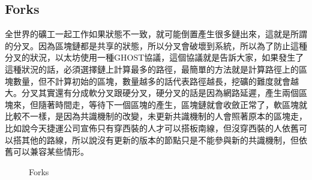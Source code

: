 \documentclass[12pt, a4paper]{article}
\begin{document}
\subsection{Forks}
全世界的礦工一起工作如果狀態不一致，就可能倒置產生很多鏈出來，這就是所謂的分叉。因為區塊鏈都是共享的狀態，所以分叉會破壞到系統，所以為了防止這種分叉的狀況，以太坊使用一種GHOST協議，這個協議就是告訴大家，如果發生了這種狀況的話，必須選擇鏈上計算最多的路徑，最簡單的方法就是計算路徑上的區塊數量，但不計算初始的區塊，數量越多的話代表路徑越長，挖礦的難度就會越大。分叉其實還有分成軟分叉跟硬分叉，硬分叉的話是因為網路延遲，產生兩個區塊來，但隨著時間走，等待下一個區塊的產生，區塊鏈就會收斂正常了，軟區塊就比較不一樣，是因為共識機制的改變，未更新共識機制的人會照著原本的區塊走，比如說今天捷運公司宣佈只有穿西裝的人才可以搭板南線，但沒穿西裝的人依舊可以搭其他的路線，所以說沒有更新的版本的節點只是不能參與新的共識機制，但依舊可以兼容某些情形。
\vspace{0.5cm}
\begin{figure}[h]
    \caption{Forks}
    \label{fig:Forks}
\end{figure}
\end{document}
